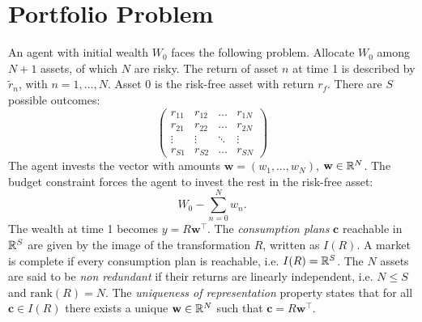 \documentclass[twoside, titlepage]{article}
\begin{document}
\section{Portfolio Problem}

An agent with initial wealth $W_0$ faces the following problem. Allocate $W_0$ among $N+1$ assets, of which $N$ are risky. The return of asset $n$ at time 1 is described by $\tilde{r}_n$, with $n = 1, \dots, N$. Asset 0 is the risk-free asset with return $r_f$. There are $S$ possible outcomes:
\[
    \begin{pmatrix}
        r_{11} & r_{12} & \dots & r_{1N} \\
        r_{21} & r_{22} & \dots & r_{2N} \\
        \vdots & \vdots & \ddots & \vdots \\
        r_{S1} & r_{S2} & \dots & r_{SN}
    \end{pmatrix}
\]
The agent invests the vector with amounts $\mathbf{w} = (w_1, \dots, w_N)$, $\mathbf{w} \in \mathbb{R}^{N}$. The budget constraint forces the agent to invest the rest in the risk-free asset:
\[
    W_0 - \sum_{n=0}^N w_n.
\]
The wealth at time 1 becomes $y = R\mathbf{w}^\top$. The \textit{consumption plans} $\mathbf{c}$ reachable in $\mathbb{R}^S$ are given by the image of the transformation $R$, written as $I(R)$. A market is complete if every consumption plan is reachable, i.e. $I(R) = \mathbb{R}^S$. The $N$ assets are said to be \textit{non redundant} if their returns are linearly independent, i.e. $N \leq S$ and $\text{rank}(R) = N$. The \textit{uniqueness of representation} property states that for all $\mathbf{c} \in I(R)$ there exists a unique $\mathbf{w} \in \mathbb{R}^N$ such that $\mathbf{c} = R\mathbf{w}^\top$. 

\end{document}
